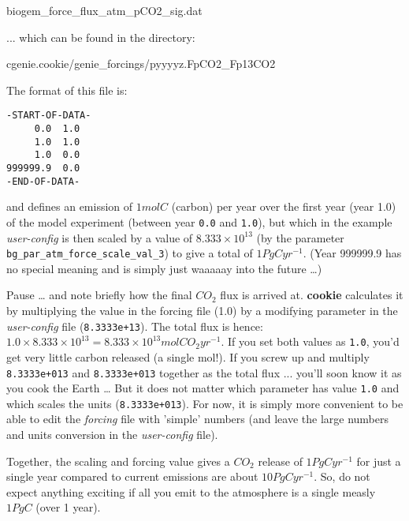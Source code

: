 \vspace{2pt}
\noindent \textsf{\footnotesize biogem\_force\_flux\_atm\_pCO2\_sig.dat}
\vspace{2pt}

\noindent ... which can be found in the directory:

\vspace{2pt}
\noindent \textsf{\footnotesize cgenie.cookie/genie\_forcings/pyyyyz.FpCO2\_Fp13CO2}
\vspace{2pt}

\vspace{2pt}
\noindent The format of this file is:
\vspace{-2pt}\footnotesize\begin{verbatim}
-START-OF-DATA-
     0.0  1.0
     1.0  1.0
     1.0  0.0
999999.9  0.0
-END-OF-DATA-
\end{verbatim}\normalsize\vspace{-2pt}

\noindent and defines an emission of \(1 mol C\) (carbon) per year over the first year (year 1.0) of the model experiment (between year \texttt{0.0} and \texttt{1.0}), but which in the example \textit{user-config} is then scaled by a value of \(8.333\times10^{13}\) (by the parameter \texttt{bg\_par\_atm\_force\_scale\_val\_3}) to give a total of \(1 PgC yr^{-1}\). (Year 999999.9 has no special meaning and is simply just waaaaay into the future …)

\vspace{1mm}

Pause … and note briefly how the final \(CO_{2}\) flux is arrived at. \textbf{cookie} calculates it by multiplying the value in the forcing file (1.0) by a modifying parameter in the \textit{user-config} file (\texttt{8.3333e+13}). The total flux is hence: \(1.0 \times 8.333\times10^{13} = 8.333\times10^{13} mol CO_{2} yr^{-1}\). If you set both values as \texttt{1.0}, you’d get very little carbon released (a single mol!). If you screw up and multiply \texttt{8.3333e+013} and \texttt{8.3333e+013} together as the total flux ... you’ll soon know it as you cook the Earth … But it does not matter which parameter has value \texttt{1.0} and which scales the units (\texttt{8.3333e+013}). For now, it is simply more convenient to be able to edit the \textit{forcing} file with 'simple' numbers (and leave the large numbers and units conversion in the \textit{user-config} file).

Together, the scaling and forcing value gives a \(CO_{2}\) release of \(1 PgC yr^{-1}\) for just a single year compared to current emissions are about \(10 PgC yr^{-1}\). So, do not expect anything exciting if all you emit to the atmosphere is a single measly \(1 PgC\) (over 1 year).

